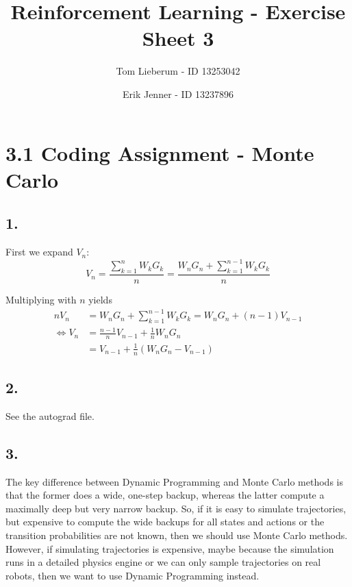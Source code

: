 \documentclass{article}
\title{Reinforcement Learning - Exercise Sheet 3}
\author{Tom Lieberum - ID 13253042 \and Erik Jenner - ID 13237896}
\begin{document}
\maketitle

\section*{3.1 Coding Assignment - Monte Carlo}

\subsection*{1.}

First we expand $V_n$:
\[
V_n = \frac{\sum_{k=1}^n W_kG_k}{n} = \frac{W_nG_n + \sum_{k=1}^{n-1} W_kG_k}{n}
\]

\noindent Multiplying with $n$ yields
\begin{align*}
nV_n &= W_nG_n + \sum_{k=1}^{n-1} W_kG_k = W_nG_n + (n-1) V_{n-1}\\[2mm] \iff V_n &= \frac{n-1}{n} V_{n-1} + \frac{1}{n}W_nG_n\\[2mm] &= V_{n-1} + \frac{1}{n}(W_nG_n - V_{n-1}) 
\end{align*}


\subsection*{2.}
See the autograd file.

\subsection*{3.}
The key difference between Dynamic Programming and Monte Carlo methods is that the former does a wide, one-step backup, whereas the latter compute a maximally deep but very narrow backup. So, if it is easy to simulate trajectories, but expensive to compute the wide backups for all states and actions or the transition probabilities are not known, then we should use Monte Carlo methods. However, if simulating trajectories is expensive, maybe because the simulation runs in a detailed physics engine or we can only sample trajectories on real robots, then we want to use Dynamic Programming instead.



\begin{comment}
\section*{3.2 Importance Sampling in Monte Carlo methods}
\subsection*{1. Disadvantage of ordinary IS in off-policy MC}

\subsection*{2. Disadvantage of weighted IS in off-policy MC}
\end{comment}
\end{document}
